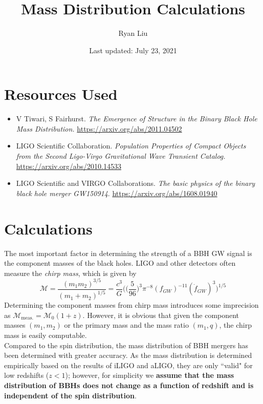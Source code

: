 \documentclass{article}
\title{Mass Distribution Calculations}
\author{Ryan Liu}
\date{Last updated: July 23, 2021}
\begin{document}
\maketitle

\section{Resources Used}

\begin{itemize}
    \item V Tiwari, S Fairhurst. \textit{The Emergence of Structure in the Binary Black Hole Mass Distribution.} \url{https://arxiv.org/abs/2011.04502}
    \item LIGO Scientific Collaboration. \textit{Population Properties of Compact Objects from the Second Ligo-Virgo Gravitational Wave Transient Catalog.} \url{https://arxiv.org/abs/2010.14533}
    \item LIGO Scientific and VIRGO Collaborations. \textit{The basic physics of the binary black hole merger GW150914}. \url{https://arxiv.org/abs/1608.01940}
\end{itemize}

\section{Calculations}

The most important factor in determining the strength of a BBH GW signal is the component masses of the black holes. LIGO and other detectors often measure the \textit{chirp mass}, which is given by 
\begin{equation}
    \mathcal{M} = \frac{(m_1m_2)^{3/5}}{(m_1+m_2)^{1/5}} = \frac{c^3}{G} \Big( \Big(\frac{5}{96}\Big)^3 \pi^{-8} (f_{GW})^{-11}(\dot{f}_{GW})^3\Big)^{1/5}
\end{equation}
Determining the component masses from chirp mass introduces some imprecision as $\mathcal{M}_\text{meas.} = \mathcal{M}_0 (1+z)$. However, it is obvious that given the component masses $(m_1, m_2)$ or the primary mass and the mass ratio $(m_1, q)$, the chirp mass is easily computable. \\

Compared to the spin distribution, the mass distribution of BBH mergers has been determined with greater accuracy. As the mass distribution is determined empirically based on the results of iLIGO and aLIGO, they are only ``valid" for low redshifts ($z < 1$); however, for simplicity we \textbf{assume that the mass distribution of BBHs does not change as a function of redshift and is independent of the spin distribution}. \\
\end{document}
